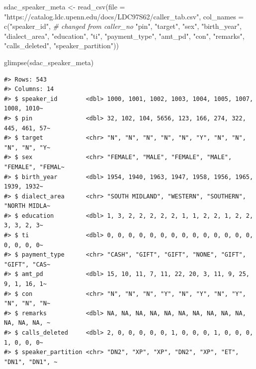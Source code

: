 \documentclass[
  letterpaper,
]{latex/krantz}
\newenvironment{Shaded}{\begin{snugshade}}{\end{snugshade}}
\newcommand{\AttributeTok}[1]{\textcolor[rgb]{0.00,0.00,0.00}{#1}}
\newcommand{\CommentTok}[1]{\textcolor[rgb]{0.00,0.00,0.00}{\textit{#1}}}
\newcommand{\FunctionTok}[1]{\textcolor[rgb]{0.00,0.00,0.00}{#1}}
\newcommand{\NormalTok}[1]{\textcolor[rgb]{0.00,0.00,0.00}{#1}}
\newcommand{\OtherTok}[1]{\textcolor[rgb]{0.00,0.00,0.00}{#1}}
\newcommand{\StringTok}[1]{\textcolor[rgb]{0.00,0.00,0.00}{#1}}
\begin{document}
\begin{Shaded}
\begin{Highlighting}[]
\NormalTok{sdac\_speaker\_meta }\OtherTok{\textless{}{-}} 
  \FunctionTok{read\_csv}\NormalTok{(}\AttributeTok{file =} \StringTok{"https://catalog.ldc.upenn.edu/docs/LDC97S62/caller\_tab.csv"}\NormalTok{, }
           \AttributeTok{col\_names =} \FunctionTok{c}\NormalTok{(}\StringTok{"speaker\_id"}\NormalTok{, }\CommentTok{\# changed from \textasciigrave{}caller\_no\textasciigrave{}}
                         \StringTok{"pin"}\NormalTok{,}
                         \StringTok{"target"}\NormalTok{,}
                         \StringTok{"sex"}\NormalTok{,}
                         \StringTok{"birth\_year"}\NormalTok{,}
                         \StringTok{"dialect\_area"}\NormalTok{,}
                         \StringTok{"education"}\NormalTok{,}
                         \StringTok{"ti"}\NormalTok{,}
                         \StringTok{"payment\_type"}\NormalTok{,}
                         \StringTok{"amt\_pd"}\NormalTok{,}
                         \StringTok{"con"}\NormalTok{,}
                         \StringTok{"remarks"}\NormalTok{,}
                         \StringTok{"calls\_deleted"}\NormalTok{,}
                         \StringTok{"speaker\_partition"}\NormalTok{))}

\FunctionTok{glimpse}\NormalTok{(sdac\_speaker\_meta)}
\end{Highlighting}
\end{Shaded}

\begin{verbatim}
#> Rows: 543
#> Columns: 14
#> $ speaker_id        <dbl> 1000, 1001, 1002, 1003, 1004, 1005, 1007, 1008, 1010~
#> $ pin               <dbl> 32, 102, 104, 5656, 123, 166, 274, 322, 445, 461, 57~
#> $ target            <chr> "N", "N", "N", "N", "N", "Y", "N", "N", "N", "N", "Y~
#> $ sex               <chr> "FEMALE", "MALE", "FEMALE", "MALE", "FEMALE", "FEMAL~
#> $ birth_year        <dbl> 1954, 1940, 1963, 1947, 1958, 1956, 1965, 1939, 1932~
#> $ dialect_area      <chr> "SOUTH MIDLAND", "WESTERN", "SOUTHERN", "NORTH MIDLA~
#> $ education         <dbl> 1, 3, 2, 2, 2, 2, 2, 1, 1, 2, 2, 1, 2, 2, 3, 3, 2, 3~
#> $ ti                <dbl> 0, 0, 0, 0, 0, 0, 0, 0, 0, 0, 0, 0, 0, 0, 0, 0, 0, 0~
#> $ payment_type      <chr> "CASH", "GIFT", "GIFT", "NONE", "GIFT", "GIFT", "CAS~
#> $ amt_pd            <dbl> 15, 10, 11, 7, 11, 22, 20, 3, 11, 9, 25, 9, 1, 16, 1~
#> $ con               <chr> "N", "N", "N", "Y", "N", "Y", "N", "Y", "N", "N", "N~
#> $ remarks           <dbl> NA, NA, NA, NA, NA, NA, NA, NA, NA, NA, NA, NA, NA, ~
#> $ calls_deleted     <dbl> 2, 0, 0, 0, 0, 0, 1, 0, 0, 0, 1, 0, 0, 0, 1, 0, 0, 0~
#> $ speaker_partition <chr> "DN2", "XP", "XP", "DN2", "XP", "ET", "DN1", "DN1", ~
\end{verbatim}
\end{document}
